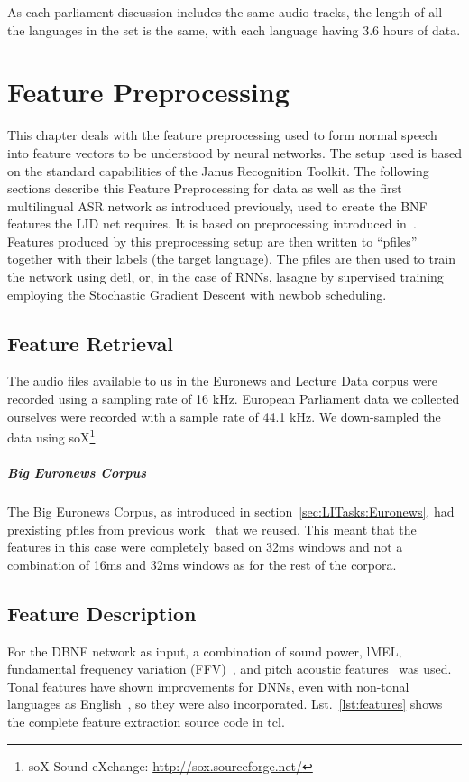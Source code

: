 As each parliament discussion includes the same audio tracks, the length of all the languages in the set is the same, with each language having 3.6 hours of data. 

\chapter{Feature Preprocessing}
\label{ch:FP}

This chapter deals with the feature preprocessing used to form normal speech into feature vectors to be understood by neural networks. The setup used is based on the standard capabilities of the Janus Recognition Toolkit. The following sections describe this Feature Preprocessing for data as well as the first multilingual ASR network as introduced previously, used to create the BNF features the LID net requires.  It is based on preprocessing introduced in~\cite{Mueller2016b}.
Features produced by this preprocessing setup are then written to ``pfiles'' together with their labels (the target language). The pfiles are then used to train the network using detl, or, in the case of RNNs, lasagne by supervised training employing the Stochastic Gradient Descent with newbob scheduling.

\section{Feature Retrieval}
\label{sec:FP:FA}
The audio files available to us in the Euronews and Lecture Data corpus were recorded using a sampling rate of 16 kHz. European Parliament data we collected ourselves were recorded with a sample rate of 44.1 kHz. We down-sampled the data using soX\footnote{soX Sound eXchange: \url{http://sox.sourceforge.net/}}. 
\paragraph{Big Euronews Corpus} The Big Euronews Corpus, as introduced in section~\ref{sec:LITasks:Euronews}, had prexisting pfiles from previous work~\cite{Mueller2016b} that we reused. This meant that the features in this case were completely based on 32ms windows and not a combination of 16ms and 32ms windows as for the rest of the corpora.

\section{Feature Description}
\label{sec:FP:FD}
For the DBNF network as input, a combination of sound power, lMEL, fundamental frequency variation (FFV)~\cite{laskowski2008fundamental}, \cite{laskowski2008fundamental} and pitch acoustic features~\cite{schubert1999grundfrequenzverfolgung} was used. Tonal features have shown improvements for DNNs, even with non-tonal languages as English~\cite{metze2013models}, so they were also incorporated. Lst.~\ref{lst:features} shows the complete feature extraction source code in tcl.

